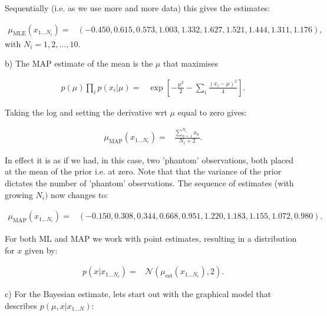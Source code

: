 Sequentially (i.e. as we use more and more data) this gives the estimates:

\begin{align*}
\mu_{\mbox{MLE}}(x_{1\ldots N_{i}})= & (-0.450,0.615,0.573,1.003,1.332,1.627,1.521,1.444,1.311,1.176),
\end{align*}
with $N_i = 1,2, \ldots , 10$.

b) The MAP estimate of the mean is the $\mu$ that maximises

\begin{align*}
p(\mu)\prod_{i}p(x_{i}|\mu)= & \exp\left[-\frac{\mu^{2}}{2}-\sum_{i}\frac{(x_{i}-\mu)^{2}}{4}\right].
\end{align*}


Taking the log and setting the derivative wrt $\mu$ equal to zero
gives:

\begin{align*}
\mu_{\mbox{MAP}}(x_{1\ldots N_{i}})= & \frac{\sum_{n=1}^{N_{i}}x_{n}}{N_{i}+2}.
\end{align*}


In effect it is as if we had, in this case, two 'phantom' observations,
both placed at the mean of the prior i.e. at zero. Note that that
the variance of the prior dictates the number of 'phantom' observations.
The sequence of estimates (with growing $N_i)$ now changes to:

\begin{align*}
\mu_{\mbox{MAP}}(x_{1\ldots N_{i}})= & (-0.150,0.308,0.344,0.668,0.951,1.220,1.183,1.155,1.072,0.980).
\end{align*}


For both ML and MAP we work with point estimates, resulting in a distribution
for $x$ given by:

\begin{align*}
p(x|x_{1\ldots N_{i}})= & \mathcal{N}(\mu_{\mbox{est}}(x_{1\ldots N_{i}}),2).
\end{align*}


c) For the Bayesian estimate, lets start out with the graphical model
that describes $p(\mu,x|x_{1\ldots N})$:

